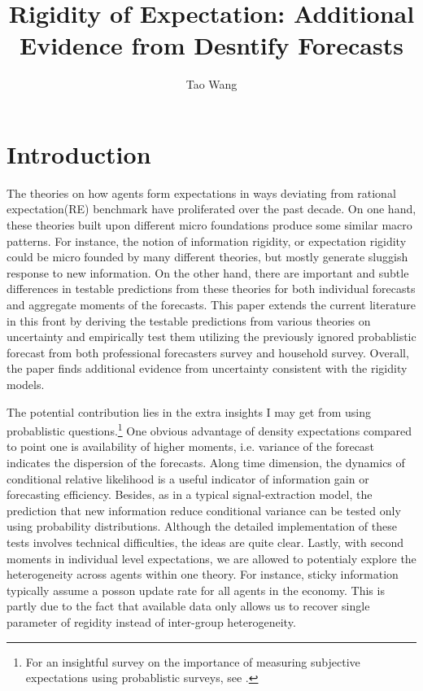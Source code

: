 \documentclass[]{article}
\title{Rigidity of Expectation: Additional Evidence from Desntify Forecasts}
\author{Tao Wang}
\begin{document}
\maketitle

\section{Introduction}


The theories on how agents form expectations in ways deviating from rational expectation(RE) benchmark have proliferated over the past decade. On one hand, these theories built upon different micro foundations produce some similar macro patterns. For instance, the notion of information rigidity, or expectation rigidity could be micro founded by many different theories, but mostly generate sluggish response to new information.  On the other hand, there are important and subtle differences in testable predictions from these theories for both individual forecasts and aggregate moments of the forecasts. This paper extends the current literature in this front by deriving the testable predictions from various theories on uncertainty and empirically test them utilizing the previously ignored probablistic forecast from both professional forecasters survey and household survey. Overall, the paper finds additional evidence from uncertainty consistent with the rigidity models. 

The potential contribution lies in the extra insights I may get from using probablistic questions.\footnote{For an insightful survey on the importance of measuring subjective expectations using probablistic surveys, see \citet{manski2004measuring}.} One obvious advantage of density expectations compared to point one is availability of higher moments, i.e. variance of the forecast indicates the dispersion of the forecasts. Along time dimension, the dynamics of conditional relative likelihood is a useful indicator of information gain or forecasting efficiency. Besides, as in a typical signal-extraction model, the prediction that new information reduce conditional variance can be tested only using probability distributions. Although the detailed implementation of these tests involves technical difficulties, the ideas are quite clear.  Lastly, with second moments in individual level expectations, we are allowed to potentialy explore the heterogeneity across agents within one theory. For instance, sticky information typically assume a posson update rate for all agents in the economy. This is partly due to the fact that available data only allows us to recover single parameter of regidity instead of inter-group heterogeneity.  
\end{document}
